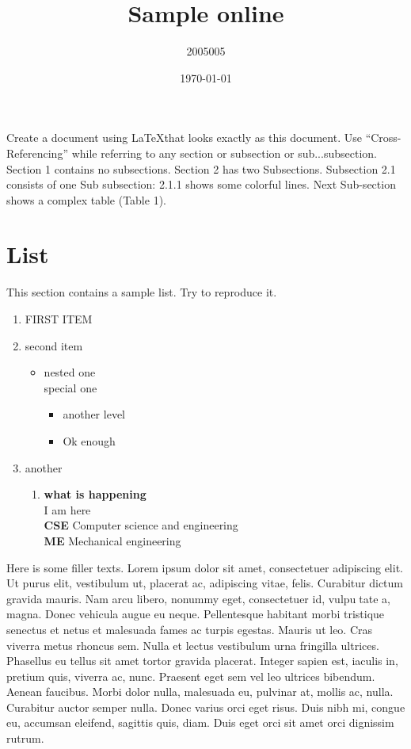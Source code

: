 \documentclass[18pt]{article}
\title{Sample online}
\author{2005005}
\date{\today}
\begin{document}
  \maketitle
  Create a document using \LaTeX that looks exactly as this document. Use
“Cross-Referencing” while referring to any section or subsection or sub...subsection.
Section 1 contains no subsections. Section 2 has two Subsections. Subsection
2.1 consists of one Sub subsection: 2.1.1 shows some colorful lines. Next Sub-section shows a complex table (Table 1).
\section{List}
   This section contains a sample list. Try to reproduce it.
   \begin{enumerate}
       \item \uppercase{first item}
       \item second item
       \begin{itemize}
           \item nested one\\ special one
           \begin{itemize}
               \item another level
               \item Ok enough
           \end{itemize}
       \end{itemize}
       \item another
       \begin{enumerate}
           \item \textbf{what is happening}\\I am here\\ \textbf{CSE} Computer science and engineering\\ \textbf{ME} Mechanical engineering
       \end{enumerate}
   \end{enumerate}
  Here is some filler texts. Lorem ipsum dolor sit amet, consectetuer adipiscing
elit. Ut purus elit, vestibulum ut, placerat ac, adipiscing vitae, felis.  Curabitur
dictum gravida mauris. Nam arcu libero, nonummy eget, consectetuer id, vulputate a, magna. Donec vehicula augue eu neque. Pellentesque habitant morbi
tristique senectus et netus et malesuada fames ac turpis egestas. Mauris ut
leo. Cras viverra metus rhoncus sem. Nulla et lectus vestibulum urna fringilla
ultrices. Phasellus eu tellus sit amet tortor gravida placerat. Integer sapien
est, iaculis in, pretium quis, viverra ac, nunc. Praesent eget sem vel leo ultrices bibendum. Aenean faucibus. Morbi dolor nulla, malesuada eu, pulvinar at,
mollis ac, nulla. Curabitur auctor semper nulla. Donec varius orci eget risus.
Duis nibh mi, congue eu, accumsan eleifend, sagittis quis, diam. Duis eget orci
sit amet orci dignissim rutrum.
\end{document}
